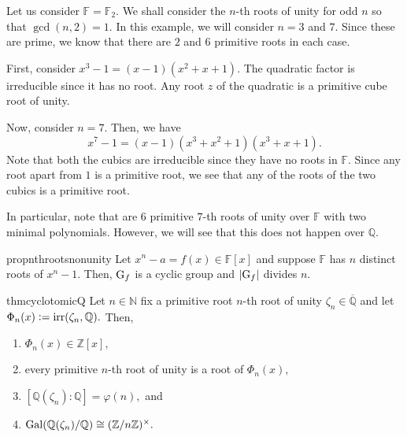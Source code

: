 \begin{ex} \label{ex:irrunityFtwo}
    Let us consider $\mathbb{F} = \mathbb{F}_2.$ We shall consider the $n$-th roots of unity for odd $n$ so that $\gcd(n, 2) = 1.$ In this example, we will consider $n = 3$ and $7.$ Since these are prime, we know that there are $2$ and $6$ primitive roots in each case.

    First, consider $x^3 - 1 = (x - 1)(x^2 + x + 1).$ The quadratic factor is irreducible since it has no root. Any root $z$ of the quadratic is a primitive cube root of unity.

    Now, consider $n = 7.$ Then, we have
    \begin{equation*} 
        x^7 - 1 = (x - 1)(x^3 + x^2 + 1)(x^3 + x + 1).
    \end{equation*}
    Note that both the cubics are irreducible since they have no roots in $\mathbb{F}.$ Since any root apart from $1$ is a primitive root, we see that any of the roots of the two cubics is a primitive root. 

    In particular, note that are $6$ primitive $7$-th roots of unity over $\mathbb{F}$ with two minimal polynomials. However, we will see that this does not happen over $\mathbb{Q}.$
\end{ex}

\begin{restatable}[]{prop}{nthrootsnonunity}
\label{prop:nthrootsnonunity}
    Let $x^n - a = f(x) \in \mathbb{F}[x]$ and suppose $\mathbb{F}$ has $n$ distinct roots of $x^n - 1.$ Then, $\operatorname{G}_f$ is a cyclic group and ${\left\lvert \operatorname{G}_f \right\lvert}$ divides $n.$ \hfill\hyperref[prop:nthrootsnonunity2]{\downsym}
\end{restatable}

\begin{restatable}[]{thm}{cyclotomicQ}
\label{thm:cyclotomicQ}
    Let $n \in \mathbb{N}$ fix a primitive root $n$-th root of unity $\zeta_n \in \overline{\mathbb{Q}}$ and let $\Phi_n(x) \vcentcolon= \operatorname{irr}(\zeta_n, \mathbb{Q}).$ Then,
    \begin{enumerate}
         \item $\Phi_n(x) \in \mathbb{Z}[x],$
         \item every primitive $n$-th root of unity is a root of $\Phi_n(x),$
         \item $[\mathbb{Q}(\zeta_n) : \mathbb{Q}] = \varphi(n),$ and
         \item $\operatorname{Gal}(\mathbb{Q}(\zeta_n)/\mathbb{Q}) \cong (\mathbb{Z}/n\mathbb{Z})^\times.$ \hfill\hyperref[thm:cyclotomicQ2]{\downsym}
     \end{enumerate} 
\end{restatable}

